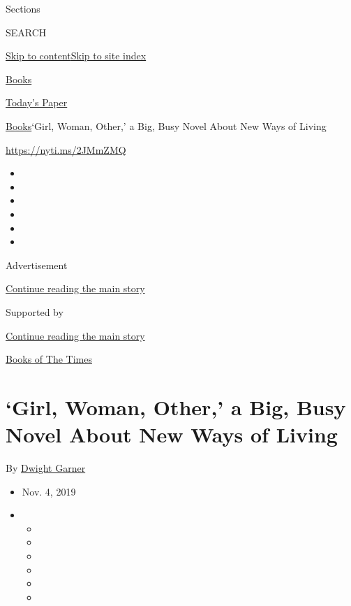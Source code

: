 Sections

SEARCH

\protect\hyperlink{site-content}{Skip to
content}\protect\hyperlink{site-index}{Skip to site index}

\href{https://www.nytimes3xbfgragh.onion/section/books}{Books}

\href{https://myaccount.nytimes3xbfgragh.onion/auth/login?response_type=cookie\&client_id=vi}{}

\href{https://www.nytimes3xbfgragh.onion/section/todayspaper}{Today's
Paper}

\href{/section/books}{Books}\textbar{}`Girl, Woman, Other,' a Big, Busy
Novel About New Ways of Living

\url{https://nyti.ms/2JMmZMQ}

\begin{itemize}
\item
\item
\item
\item
\item
\item
\end{itemize}

Advertisement

\protect\hyperlink{after-top}{Continue reading the main story}

Supported by

\protect\hyperlink{after-sponsor}{Continue reading the main story}

\href{/column/books-of-the-times}{Books of The Times}

\hypertarget{girl-woman-other-a-big-busy-novel-about-new-ways-of-living}{%
\section{`Girl, Woman, Other,' a Big, Busy Novel About New Ways of
Living}\label{girl-woman-other-a-big-busy-novel-about-new-ways-of-living}}

By \href{https://www.nytimes3xbfgragh.onion/by/dwight-garner}{Dwight
Garner}

\begin{itemize}
\item
  Nov. 4, 2019
\item
  \begin{itemize}
  \item
  \item
  \item
  \item
  \item
  \item
  \end{itemize}
\end{itemize}

